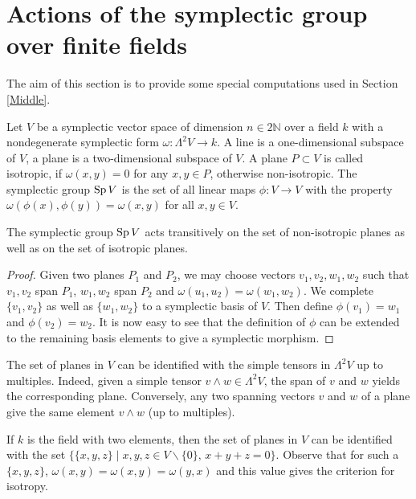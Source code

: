 \section{Actions of the symplectic group over finite fields}\label{Section_Symplectic}
The aim of this section is to provide some special computations used in Section \ref{Middle}.

Let $V$ be a symplectic vector space of dimension $n\in 2\mathbb{N}$ over a field $k$ with a nondegenerate symplectic form $\omega : \Lambda^2 V \rightarrow k$. A line is a one-dimensional subspace of $V$, a plane is a two-dimensional subspace of $V$. A plane $P\subset V$ is called isotropic, if $\omega (x,y)=0$ for any $x,y\in P$, otherwise non-isotropic.  The symplectic group $\operatorname{Sp} V$ is the set of all linear maps $\phi : V\rightarrow V$ with the property $\omega(\phi(x),\phi(y)) = \omega(x,y)$ for all $ x,y\in V$.
\begin{proposition}\label{transitively}
The symplectic group $\operatorname{Sp} V$ acts transitively on the set of non-isotropic planes as well as on the set of isotropic planes.
\end{proposition}
\begin{proof}
Given two planes $P_1$ and $P_2$, we may choose vectors $v_1,v_2,w_1,w_2$ such that $v_1,v_2$ span $P_1$, $w_1,w_2$ span $P_2$ and $\omega(u_1,u_2) =\omega(w_1,w_2)$. We complete $\{v_1,v_2\}$ as well as $\{w_1,w_2\}$ to a symplectic basis of $V$.
Then define $\phi(v_1)=w_1$ and $\phi(v_2)=w_2$. 
It is now easy to see that the definition of $\phi$ can be extended to the remaining basis elements to give a symplectic morphism.
\end{proof}
\begin{remark}
The set of planes in $V$ can be identified with the simple tensors in $\Lambda^2V$ up to multiples. Indeed, given a simple tensor $v\wedge w \in \Lambda^2 V$, the span of $v$ and $w$ yields the corresponding plane. Conversely, any two spanning vectors $v$ and $w$ of a plane give the same element $v\wedge w$ (up to multiples).
\end{remark}
\begin{remark} \label{PlaneTriple}
 If $k$ is the field with two elements, then the set of planes in $V$ can be identified with the set $\{\{x,y,z\}\;|\;x,y,z\in V\backslash\{0\},\,x+y+z=0\}$. Observe that for such a $\{x,y,z\}$, $\omega(x,y)=\omega(x,y)=\omega(y,x)$ and this value gives the criterion for isotropy.
\end{remark}

